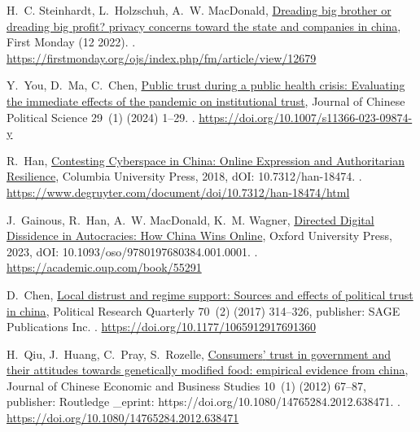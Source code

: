 \documentclass[
  number]{elsarticle}
\begin{document}
\begin{thebibliography}{10}
H.~C. Steinhardt, L.~Holzschuh, A.~W. MacDonald, \href{https://firstmonday.org/ojs/index.php/fm/article/view/12679}{Dreading big brother or dreading big profit? privacy concerns toward the state and companies in china}, First Monday (12 2022).
\newblock \href {https://doi.org/10.5210/fm.v27i12.12679} {}.
\newline\urlprefix\url{https://firstmonday.org/ojs/index.php/fm/article/view/12679}

Y.~You, D.~Ma, C.~Chen, \href{https://doi.org/10.1007/s11366-023-09874-y}{Public trust during a public health crisis: Evaluating the immediate effects of the pandemic on institutional trust}, Journal of Chinese Political Science 29~(1) (2024) 1--29.
\newblock \href {https://doi.org/10.1007/s11366-023-09874-y} {}.
\newline\urlprefix\url{https://doi.org/10.1007/s11366-023-09874-y}

R.~Han, \href{https://www.degruyter.com/document/doi/10.7312/han-18474/html}{Contesting Cyberspace in China: Online Expression and Authoritarian Resilience}, Columbia University Press, 2018, dOI: 10.7312/han-18474.
\newblock \href {https://doi.org/10.7312/han-18474} {}.
\newline\urlprefix\url{https://www.degruyter.com/document/doi/10.7312/han-18474/html}

J.~Gainous, R.~Han, A.~W. MacDonald, K.~M. Wagner, \href{https://academic.oup.com/book/55291}{Directed Digital Dissidence in Autocracies: How China Wins Online}, Oxford University Press, 2023, dOI: 10.1093/oso/9780197680384.001.0001.
\newblock \href {https://doi.org/10.1093/oso/9780197680384.001.0001} {}.
\newline\urlprefix\url{https://academic.oup.com/book/55291}

D.~Chen, \href{https://doi.org/10.1177/1065912917691360}{Local distrust and regime support: Sources and effects of political trust in china}, Political Research Quarterly 70~(2) (2017) 314--326, publisher: SAGE Publications Inc.
\newblock \href {https://doi.org/10.1177/1065912917691360} {}.
\newline\urlprefix\url{https://doi.org/10.1177/1065912917691360}

H.~Qiu, J.~Huang, C.~Pray, S.~Rozelle, \href{https://doi.org/10.1080/14765284.2012.638471}{Consumers{\textquoteright} trust in government and their attitudes towards genetically modified food: empirical evidence from china}, Journal of Chinese Economic and Business Studies 10~(1) (2012) 67--87, publisher: Routledge {\_}eprint: https://doi.org/10.1080/14765284.2012.638471.
\newblock \href {https://doi.org/10.1080/14765284.2012.638471} {}.
\newline\urlprefix\url{https://doi.org/10.1080/14765284.2012.638471}


\end{thebibliography}
\end{document}
